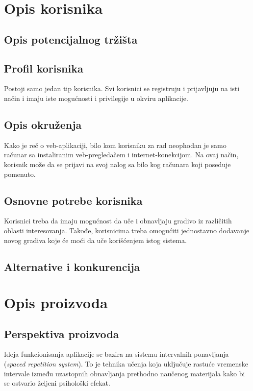 \chapter{Opis korisnika}

\section{Opis potencijalnog tržišta}

\section{Profil korisnika}
Postoji samo jedan tip korisnika.
Svi korisnici se registruju i prijavljuju na isti način i imaju iste mogućnosti i privilegije u okviru aplikacije.

\section{Opis okruženja}
Kako je reč o veb-aplikaciji, bilo kom korisniku za rad neophodan je samo računar sa instaliranim veb-pregledačem i internet-konekcijom.
Na ovaj način, korisnik može da se prijavi na svoj nalog sa bilo kog računara koji poseduje pomenuto.

\section{Osnovne potrebe korisnika}
Korisnici treba da imaju mogućnost da uče i obnavljaju gradivo iz različitih oblasti interesovanja.
Takođe, korisnicima treba omogućiti jednostavno dodavanje novog gradiva koje će moći da uče korišćenjem istog sistema.

\section{Alternative i konkurencija}




\chapter{Opis proizvoda}

\section{Perspektiva proizvoda}
Ideja funkcionisanja aplikacije se bazira na sistemu intervalnih ponavljanja (\textit{spaced repetition system}).
To je tehnika učenja koja uključuje rastuće vremenske intervale između uzastopnih obnavljanja prethodno naučenog materijala kako bi se ostvario željeni psihološki efekat.

